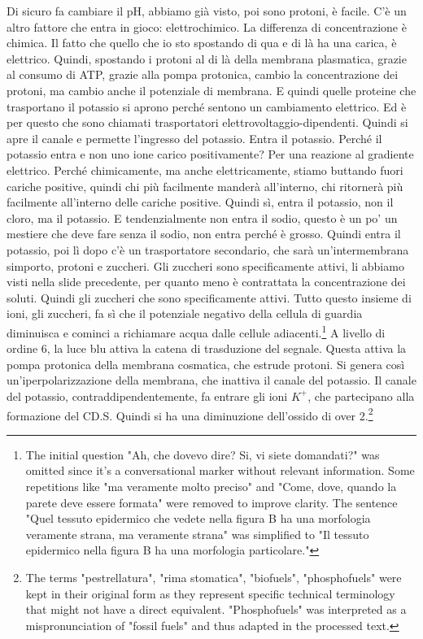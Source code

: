 \documentclass[11pt, a4paper]{article}
\begin{document}
\begin{spacing}{1.15}
Di sicuro fa cambiare il pH, abbiamo già visto, poi sono protoni, è facile. C'è un altro fattore che entra in gioco: elettrochimico. La differenza di concentrazione è chimica. Il fatto che quello che io sto spostando di qua e di là ha una carica, è elettrico. Quindi, spostando i protoni al di là della membrana plasmatica, grazie al consumo di ATP, grazie alla pompa protonica, cambio la concentrazione dei protoni, ma cambio anche il potenziale di membrana. E quindi quelle proteine che trasportano il potassio si aprono perché sentono un cambiamento elettrico. Ed è per questo che sono chiamati trasportatori elettrovoltaggio-dipendenti. Quindi si apre il canale e permette l'ingresso del potassio. Entra il potassio.
Perché il potassio entra e non uno ione carico positivamente? Per una reazione al gradiente elettrico. Perché chimicamente, ma anche elettricamente, stiamo buttando fuori cariche positive, quindi chi più facilmente manderà all'interno, chi ritornerà più facilmente all'interno delle cariche positive. Quindi sì, entra il potassio, non il cloro, ma il potassio. E tendenzialmente non entra il sodio, questo è un po' un mestiere che deve fare senza il sodio, non entra perché è grosso. Quindi entra il potassio, poi lì dopo c'è un trasportatore secondario, che sarà un'intermembrana simporto, protoni e zuccheri. Gli zuccheri sono specificamente attivi, li abbiamo visti nella slide precedente, per quanto meno è contrattata la concentrazione dei soluti. Quindi gli zuccheri che sono specificamente attivi. Tutto questo insieme di ioni, gli zuccheri, fa sì che il potenziale negativo della cellula di guardia diminuisca e cominci a richiamare acqua dalle cellule adiacenti.\footnote{The initial question "Ah, che dovevo dire? Si, vi siete domandati?" was omitted since it's a conversational marker without relevant information. Some repetitions like "ma veramente molto preciso" and "Come, dove, quando la parete deve essere formata" were removed to improve clarity. The sentence "Quel tessuto epidermico che vedete nella figura B ha una morfologia veramente strana, ma veramente strana" was simplified to "Il tessuto epidermico nella figura B ha una morfologia particolare."}
A livello di ordine 6, la luce blu attiva la catena di trasduzione del segnale. Questa attiva la pompa protonica della membrana cosmatica, che estrude protoni. Si genera così un'iperpolarizzazione della membrana, che inattiva il canale del potassio. Il canale del potassio, contraddipendentemente, fa entrare gli ioni $K^{+}$, che partecipano alla formazione del CD.S. Quindi si ha una diminuzione dell'ossido di over 2.\footnote{The terms "pestrellatura", "rima stomatica", "biofuels", "phosphofuels" were kept in their original form as they represent specific technical terminology that might not have a direct equivalent. "Phosphofuels" was interpreted as a mispronunciation of "fossil fuels" and thus adapted in the processed text.}

\end{spacing}
\end{document}
